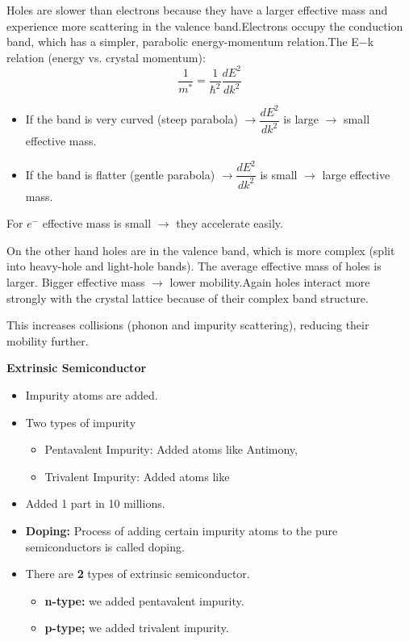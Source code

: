 \documentclass[a4aper,12pt]{report}
\newcounter{questionbox}[chapter]
\begin{document}
\begin{questionbox}
    Holes are slower than electrons because they have a larger effective mass and experience more scattering in the valence band.Electrons occupy the conduction band, which has a simpler, parabolic energy-momentum relation.The E$-$k relation (energy vs. crystal momentum):
    \[
    \frac{1}{m^*}=\frac{1}{\hbar ^2}\dfrac{dE^2}{dk^2}
    \]
    \begin{itemize}
        \item If the band is very curved (steep parabola) $\rightarrow \dfrac{dE^2}{dk^2}$
 is large $\rightarrow$ small effective mass.
 \item If the band is flatter (gentle parabola)   $\rightarrow \dfrac{dE^2}{dk^2}$ is small $\rightarrow$ large effective mass.
    \end{itemize}
    For $e^-$ effective mass is small $\rightarrow$ they accelerate easily.

On the other hand holes are in the valence band, which is more complex (split into heavy-hole and light-hole bands). The average effective mass of holes is larger. Bigger effective mass $\rightarrow$ lower mobility.Again holes interact more strongly with the crystal lattice because of their complex band structure.

This increases collisions (phonon and impurity scattering), reducing their mobility further. %
\end{questionbox}
\textbf{\large Extrinsic Semiconductor}
\begin{itemize}
    \item Impurity atoms are added.
    \item Two types of impurity 
    \begin{itemize}
        \item Pentavalent Impurity: Added atoms like Antimony, 
        \item Trivalent Impurity: Added atoms like 
    \end{itemize}
    \item Added 1 part in 10 millions.
    \item \textbf{Doping: }Process of adding certain impurity atoms to the pure semiconductors is called doping.
    \item There are \textbf{2} types of extrinsic semiconductor. \begin{itemize}
        \item \textbf{n-type: }we added pentavalent impurity. 
        \item \textbf{p-type; }we added trivalent impurity.
    \end{itemize}
\end{itemize}
\end{document}
